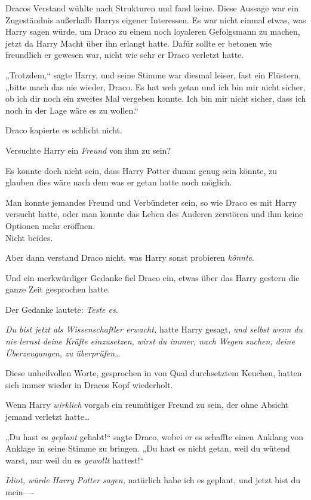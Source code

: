 {Dracos Verstand wühlte nach Strukturen und fand keine. Diese Aussage war ein Zugeständnis außerhalb Harrys eigener Interessen. Es war nicht einmal etwas, was Harry sagen würde, um Draco zu einem noch loyaleren Gefolgsmann zu machen, jetzt da Harry Macht über ihn erlangt hatte. Dafür sollte er betonen wie freundlich er gewesen war, nicht wie sehr er Draco verletzt hatte.

„Trotzdem,“ sagte Harry, und seine Stimme war diesmal leiser, fast ein Flüstern, „bitte mach das nie wieder, Draco. Es hat weh getan und ich bin mir nicht sicher, ob ich dir noch ein zweites Mal vergeben konnte. Ich bin mir nicht sicher, dass ich noch in der Lage wäre es zu wollen.“

Draco kapierte es schlicht nicht.

Versuchte Harry ein \emph{Freund} von ihm zu sein?

Es konnte doch nicht sein, dass Harry Potter dumm genug sein könnte, zu glauben dies wäre nach dem was er getan hatte noch möglich.

Man konnte jemandes Freund und Verbündeter sein, so wie Draco es mit Harry versucht hatte, oder man konnte das Leben des Anderen zerstören und ihm keine Optionen mehr eröffnen.\\ Nicht beides.

Aber dann verstand Draco nicht, was Harry sonst probieren \emph{könnte}.

Und ein merkwürdiger Gedanke fiel Draco ein, etwas über das Harry gestern die ganze Zeit gesprochen hatte.

Der Gedanke lautete: \emph{Teste es}.

\emph{Du bist jetzt als Wissenschaftler erwacht,} hatte Harry gesagt, \emph{und selbst wenn du nie lernst deine Kräfte einzusetzen, wirst du immer, nach Wegen suchen, deine Überzeugungen, zu überprüfen…}

Diese unheilvollen Worte, gesprochen in von Qual durchsetztem Keuchen, hatten sich immer wieder in Dracos Kopf wiederholt.

Wenn Harry \emph{wirklich} vorgab ein reumütiger Freund zu sein, der ohne Absicht jemand verletzt hatte…

„Du hast es \emph{geplant} gehabt!“ sagte Draco, wobei er es schaffte einen Anklang von Anklage in seine Stimme zu bringen. „Du hast es nicht getan, weil du wütend warst, nur weil du es \emph{gewollt} hattest!“

\emph{Idiot, würde Harry Potter sagen,} natürlich habe ich es geplant, und jetzt bist du mein----

}
